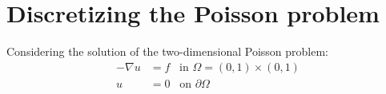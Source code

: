 
\section{Discretizing the Poisson problem} %
\label{sec:discretizing_the_poisson_problem}
Considering the solution of the two-dimensional Poisson problem:
\begin{align}
  - \nabla u &= f \;\;\; \text{in } \Omega = (0,1) \times (0,1) \\
  u &= 0 \;\;\; \text{on } \partial \Omega
\end{align}


